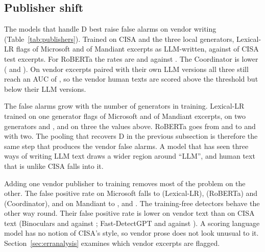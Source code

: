 \documentclass[journal]{IEEEtran}
\begin{document}

\subsection{Publisher shift}
The models that handle D best raise false alarms on vendor writing (Table~\ref{tab:publishers}). Trained on CISA
and the three local generators, Lexical-LR flags \PubMicrosoftLexlrFpr{} of Microsoft and \PubMandiantLexlrFpr{} of
Mandiant excerpts as LLM-written, against \PubCisaLexlrFpr{} of CISA test excerpts. For RoBERTa the rates are
\PubMicrosoftTransFpr{} and \PubMandiantTransFpr{} against \PubCisaTransFpr{}. The Coordinator is lower
(\PubMicrosoftCoordFpr{} and \PubMandiantCoordFpr{}). On vendor excerpts paired with their own LLM versions all
three still reach an AUC of \PubMicrosoftTransAuc{}, so the vendor human texts are scored above the threshold but
below their LLM versions.

The false alarms grow with the number of generators in training. Lexical-LR trained on one generator flags
\PoolfprOneMicrosoftLexlr{} of Microsoft and \PoolfprOneMandiantLexlr{} of Mandiant excerpts, on two generators
\PoolfprTwoMicrosoftLexlr{} and \PoolfprTwoMandiantLexlr{}, and on three the values above. RoBERTa goes from
\PoolfprOneMicrosoftTrans{} and \PoolfprOneMandiantTrans{} to \PoolfprTwoMicrosoftTrans{} and
\PoolfprTwoMandiantTrans{} with two. The pooling that recovers D in the previous subsection is therefore the same
step that produces the vendor false alarms. A model that has seen three ways of writing LLM text draws a wider
region around ``LLM'', and human text that is unlike CISA falls into it.

Adding one vendor publisher to training removes most of the problem on the other. The false positive rate on
Microsoft falls to \PubMicrosoftLexlrFprAug{} (Lexical-LR), \PubMicrosoftTransFprAug{} (RoBERTa) and
\PubMicrosoftCoordFprAug{} (Coordinator), and on Mandiant to \PubMandiantLexlrFprAug{}, \PubMandiantTransFprAug{}
and \PubMandiantCoordFprAug{}. The training-free detectors behave the other way round. Their false positive rate is
lower on vendor text than on CISA text (Binoculars \PubMicrosoftBinoFpr{} and \PubMandiantBinoFpr{} against
\PubCisaBinoFpr{}; Fast-DetectGPT \PubMicrosoftFastFpr{} and \PubMandiantFastFpr{} against \PubCisaFastFpr{}). A
scoring language model has no notion of CISA's style, so vendor prose does not look unusual to it.
Section~\ref{sec:erranalysis} examines which vendor excerpts are flagged.


\end{document}
